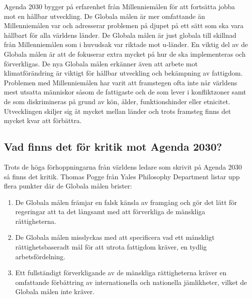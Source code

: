 \documentclass{report}
\begin{document}
Agenda 2030 bygger på erfarenhet från Millenniemålen för att fortsätta jobba mot en hållbar utveckling. \cite{webEuropeanComission}
De Globala målen är mer omfattande än Millenniemålen var och adresserar problemen på djupet på ett sätt som ska vara hållbart för alla världens länder. De Globala målen är just globala till skillnad från Millenniemålen som i huvudsak var riktade mot u-länder. En viktig del av de Globala målen är att de fokuserar extra mycket på hur de ska implementeras och förverkligas. De nya Globala målen erkänner även att arbete mot klimatförändring är viktigt för hållbar utveckling och bekämpning av fattigdom. \cite{web2030agenda}
Problemen med Millenniemålen har varit att framstegen ofta inte når världens mest utsatta människor såsom de fattigaste och de som lever i konfliktzoner samt de som diskrimineras på grund av kön, ålder, funktionshinder eller etnicitet. Utvecklingen skiljer sig åt mycket mellan länder och trots framsteg finns det mycket kvar att förbättra.\cite{Millennium}\\

\subsection{Vad finns det för kritik mot Agenda 2030?} 
Trots de höga förhoppningarna från världens ledare som skrivit på Agenda 2030 så finns det kritik. Thomas Pogge från Yales Philosophy Department listar upp flera punkter där de Globala målen brister: 

\begin{enumerate}
\item De Globala målen främjar en falsk känsla av framgång och gör det lätt för regeringar att ta det långsamt med att förverkliga de mänskliga rättigheterna. 
\item De Globala målen misslyckas med att specificera vad ett mänskligt rättighetsbaseradt mål för att utrota fattigdom kräver, en tydlig arbetsfördelning. 
\item Ett fullständigt förverkligande av de mänskliga rättigheterna kräver en omfattande förbättring av internationella och nationella jämlikheter, vilket de Globala målen inte kräver. \cite{critique}\\
\end{enumerate} 
\end{document}
